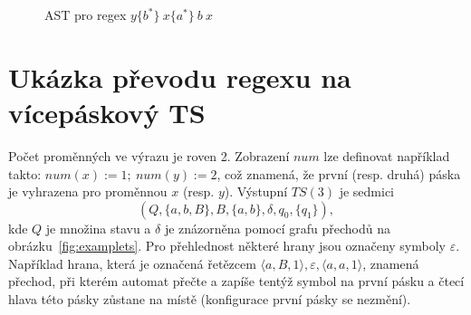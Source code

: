 \documentclass[thesis=B,czech]{FITthesis}[2019/12/23]
\theoremstyle{definition}
\begin{document}
\begin{figure}[h]
\centering

\caption{AST pro regex  $y\{b^\ast\} \ x\{a^\ast\} \ b \ x$}\label{fig:ast1}
\end{figure}
\section{Ukázka převodu regexu na vícepáskový TS}\label{ukazka:simpletm}
Počet proměnných ve výrazu je roven 2. Zobrazení $num$ lze definovat například takto:
$num(x) := 1; \ num(y) := 2$, což znamená, že první (resp. druhá) páska je vyhrazena pro proměnnou $x$ (resp. $y$). Výstupní $TS(3)$ je sedmici $$(Q, \{a, b, B\}, B, \{a, b\}, \delta, q_0, \{q_1\}),$$ kde $Q$ je množina stavu a $\delta$ je znázorněna pomocí grafu přechodů na obrázku~\ref{fig:examplets}. Pro přehlednost některé hrany jsou označeny symboly $\varepsilon$. Například hrana, která je označená řetězcem $\big \langle a, B, 1 \big\rangle, \varepsilon, \big \langle a, a, 1 \big\rangle$, znamená přechod, při kterém automat přečte a zapíše tentýž symbol na první pásku a čtecí hlava této pásky zůstane na místě (konfigurace první pásky se nezmění). 
\end{document}
